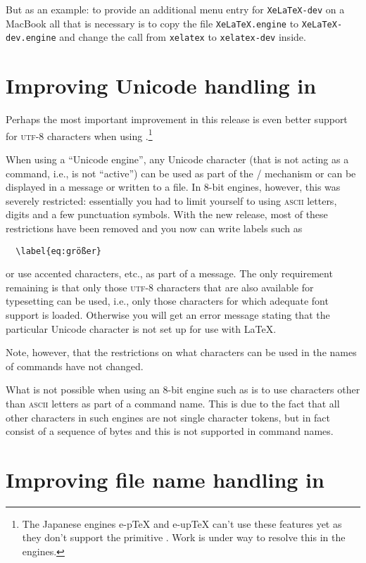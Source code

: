 \documentclass{ltnews}
\providecommand\acro[1]{\textsc{#1}}
\providecommand\pdfTeX{\hologo{pdfTeX}}
\begin{document}
But as an example: to provide an additional menu entry for
\texttt{XeLaTeX-dev} on a MacBook all that is necessary is to copy
the file \texttt{XeLaTeX.engine} to \texttt{XeLaTeX-dev.engine} and change the
call from \texttt{xelatex} to \texttt{xelatex-dev} inside.




\section{Improving Unicode handling in \pdfTeX{}}

Perhaps the most important improvement in this release is
even
better support for \acro{utf}-8 characters when using \pdfTeX{}.\footnote{The
  Japanese engines e-p\TeX{} and e-up\TeX{} can't use these features
  yet as they don't support the primitive . Work is
  under way to resolve this in the engines.}

When using a \enquote{Unicode engine},
any Unicode character (that is not acting as a command,
i.e., is not \enquote{active})
can be used as part of the
/ mechanism or can be displayed in a message or
written to a file. In 8-bit engines, however, this was severely
restricted:
essentially you had to limit yourself to using
\acro{ascii} letters, digits and a few punctuation symbols.  With the
new release, most of these restrictions have been removed and you now
can write labels such as
\begin{verbatim}
  \label{eq:größer}
\end{verbatim}
or use accented characters, etc., as part of a  message.
The only requirement remaining is that only those \acro{utf}-8 characters
that are also available for typesetting can be used, i.e., only those
characters for
which adequate font support is loaded. Otherwise you will get an
error message stating that
the
particular Unicode character is not set
up for use with \LaTeX{}.

Note, however, that the restrictions on what characters can be
used in the names of commands have not changed.

What is not possible when using
an 8-bit engine such as \pdfTeX{} is to use
characters other than \acro{ascii} letters as part of a command
name. This is due to the fact that all other characters in such
engines are not single character tokens, but in fact consist of a
sequence of bytes and this is not supported in command names.

\section{Improving file name handling in \pdfTeX{}}
\end{document}
